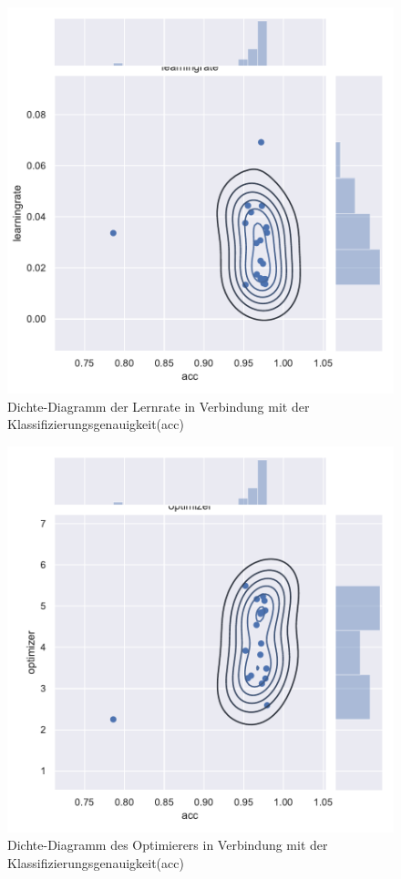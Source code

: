 \begin{figure}[H]
  \centering  
  \includegraphics[scale=0.5]{anhang/GA_50_mnist_digits_False_big_jointplot_learningrate.pdf}
  \caption{Dichte-Diagramm der Lernrate in Verbindung mit der Klassifizierungsgenauigkeit(acc)}
  
\end{figure}

\begin{figure}[H]
  \centering  
  \includegraphics[scale=0.5]{anhang/GA_50_mnist_digits_False_big_jointplot_optimizer.pdf}
  \caption{Dichte-Diagramm des Optimierers in Verbindung mit der Klassifizierungsgenauigkeit(acc)}
  
\end{figure}


